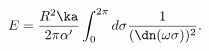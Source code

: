 \begin{equation}
E = \frac{R^2\ka}{2\pi\alpha'}\int_0^{2\pi}d\sigma \frac{1}
{(\dn(\omega\sigma))^2}.
\label{ene}\end{equation}

